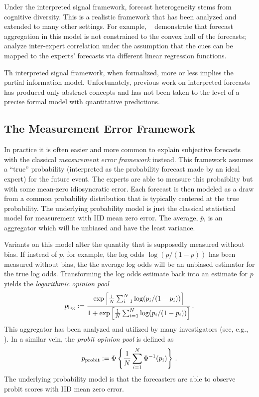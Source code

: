 \documentclass[11pt]{article}
\theoremstyle{definition}
\theoremstyle{definition}
\def\pb{\overline{p}}
\def\probit{p_{\rm probit}}
\def\plog{p_{\rm log}}
\begin{document}
Under the interpreted signal framework, forecast heterogeneity 
stems from cognitive diversity.  This is a realistic framework that
has been analyzed and extended to many other settings.  For example,
~\citet{parunak2013characterizing} demonstrate that 
forecast aggregation in this model is not constrained to the convex 
hull of the forecasts;~\citet{broomell2009experts}
analyze inter-expert correlation
under the assumption that the cues can be mapped to the experts'
forecasts via different linear regression functions.

Th interpreted signal framework, when formalized, more or less implies 
the partial information model.  Unfortunately, previous work on
interpreted forecasts has produced only abstract concepts and 
has not been taken to the level of a precise formal model with 
quantitative predictions.  

\subsection{The Measurement Error Framework}
\label{ss:measurement}

In practice it is often easier and more common to explain subjective
forecasts with the classical {\em measurement error framework}
instead.  This framework assumes a ``true'' probability (interpreted
as the probability forecast made by an ideal expert) for the future 
event.  The experts are able to measure this probaiblity but with
some mean-zero idiosyncratic error.  Each forecast is then modeled
as a draw from a common probability distribution that is typically 
centered at the true probability.  
%
The underlying probability model is just the classical statistical
model for measurement with IID mean zero error.  The average, $\pb$,
is an aggregator which will be unbiased and have the least variance.

Variants on this model alter the quantity that is supposedly 
measured without bias.  If instead of $p$, for example,
the log odds $\log (p/(1-p))$ has been measured without bias, 
the the average log odds will be an unbiased estimator for
the true log odds.  Transforming the log odds estimate back into
an estimate for $p$ yields the {\em logarithmic opinion pool}
$$\plog := \frac{\exp \left [ \frac{1}{N} \sum_{i=1}^N
   \log (p_i / (1-p_i)) \right ]}
{1 + \exp \left [ \frac{1}{N} \sum_{i=1}^N
   \log (p_i / (1-p_i)) \right ]} \, .$$
This aggregator has been analyzed and utilized by many investigators
(see, e.g., \citet{dawid1995coherent, Genest, bacharach1975group}).
In a similar vein, the {\em probit opinion pool} is defined as
$$\probit := \Phi \left \{ \frac{1}{N} \sum_{i=1}^N \Phi^{-1}
   (p_i) \right \} \, .$$
The underlying probability model is that the forecasters are able
to observe probit scores with IID mean zero error.
\end{document}
